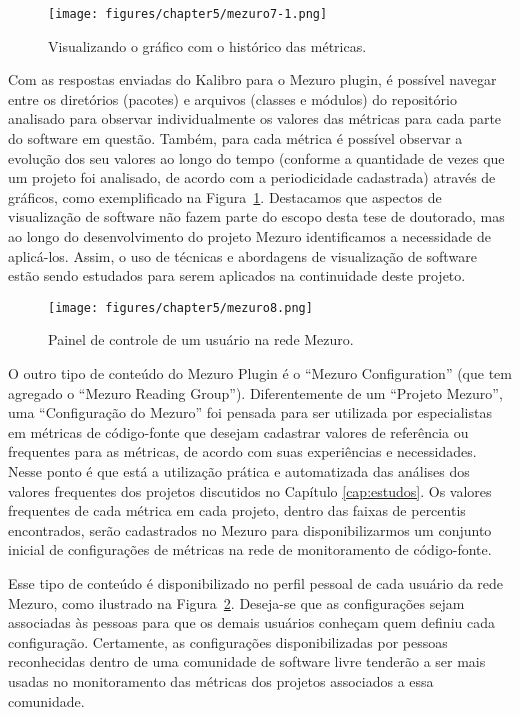 \begin{figure}[!h]
\centering
\texttt{[image: figures/chapter5/mezuro7-1.png]}
\caption{Visualizando o gráfico com o histórico das métricas.}
\label{mezuro7.1}
\end{figure}

Com as respostas enviadas do Kalibro para o Mezuro plugin, é possível navegar
entre os diretórios (pacotes) e arquivos (classes e módulos) do repositório
analisado para observar individualmente os valores das métricas para cada
parte do software em questão.
%
Também, para cada métrica é possível observar a evolução dos seu valores
ao longo do tempo (conforme a quantidade de vezes que um projeto foi analisado,
de acordo com a periodicidade cadastrada) através de gráficos, como
exemplificado na Figura~\ref{mezuro7.1}.
%
Destacamos que aspectos de visualização de software não fazem parte do escopo desta tese de
doutorado, mas ao longo do desenvolvimento do projeto Mezuro identificamos
a necessidade de aplicá-los. Assim, o uso de técnicas e abordagens de
visualização de software estão sendo estudados para serem aplicados na
continuidade deste projeto.


\begin{figure}[!h]
\centering
\texttt{[image: figures/chapter5/mezuro8.png]}
\caption{Painel de controle de um usuário na rede Mezuro.}
\label{mezuro8}
\end{figure}

O outro tipo de conteúdo do Mezuro Plugin é o ``Mezuro Configuration'' (que tem
agregado o ``Mezuro Reading Group'').
%
Diferentemente de um ``Projeto Mezuro'', uma ``Configuração do Mezuro'' foi pensada
para ser utilizada por especialistas em métricas de código-fonte que desejam
cadastrar valores de referência ou frequentes para as métricas, de acordo com
suas experiências e necessidades.
%
Nesse ponto é que está a utilização prática e automatizada das análises dos valores
frequentes dos projetos discutidos no Capítulo \ref{cap:estudos}.
%
Os valores frequentes de cada métrica em cada projeto, dentro das faixas de
percentis encontrados, serão cadastrados no Mezuro para disponibilizarmos
um conjunto inicial de configurações de métricas na rede de monitoramento
de código-fonte.

Esse tipo de conteúdo é disponibilizado no perfil pessoal
de cada usuário da rede Mezuro, como ilustrado na Figura~\ref{mezuro8}.
%
Deseja-se que as configurações sejam associadas às pessoas para que os demais
usuários conheçam quem definiu cada configuração.
%
Certamente, as configurações disponibilizadas por pessoas reconhecidas dentro
de uma comunidade de software livre tenderão a ser mais usadas no monitoramento
das métricas dos projetos associados a essa comunidade.



